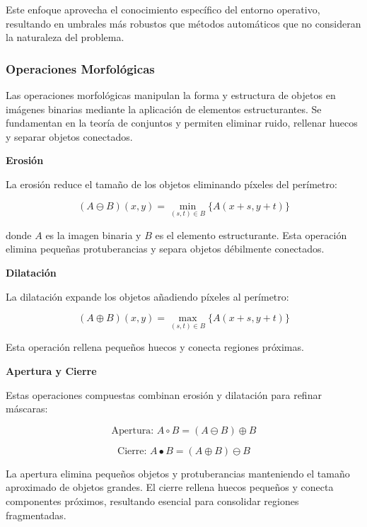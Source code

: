 Este enfoque aprovecha el conocimiento específico del entorno operativo, resultando en umbrales más robustos que métodos automáticos que no consideran la naturaleza del problema.

\subsubsection{Operaciones Morfológicas}

Las operaciones morfológicas manipulan la forma y estructura de objetos en imágenes binarias mediante la aplicación de elementos estructurantes. Se fundamentan en la teoría de conjuntos y permiten eliminar ruido, rellenar huecos y separar objetos conectados.

\textbf{Erosión}

La erosión reduce el tamaño de los objetos eliminando píxeles del perímetro:

\begin{equation}
(A \ominus B)(x,y) = \min_{(s,t) \in B} \{A(x+s, y+t)\}
\end{equation}

donde $A$ es la imagen binaria y $B$ es el elemento estructurante. Esta operación elimina pequeñas protuberancias y separa objetos débilmente conectados.

\textbf{Dilatación}

La dilatación expande los objetos añadiendo píxeles al perímetro:

\begin{equation}
(A \oplus B)(x,y) = \max_{(s,t) \in B} \{A(x+s, y+t)\}
\end{equation}

Esta operación rellena pequeños huecos y conecta regiones próximas.

\textbf{Apertura y Cierre}

Estas operaciones compuestas combinan erosión y dilatación para refinar máscaras:

\begin{equation}
\text{Apertura: } A \circ B = (A \ominus B) \oplus B
\end{equation}

\begin{equation}
\text{Cierre: } A \bullet B = (A \oplus B) \ominus B
\end{equation}

La apertura elimina pequeños objetos y protuberancias manteniendo el tamaño aproximado de objetos grandes. El cierre rellena huecos pequeños y conecta componentes próximos, resultando esencial para consolidar regiones fragmentadas.


